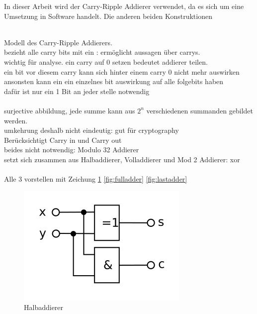 In dieser Arbeit wird der Carry-Ripple Addierer verwendet, da es sich um eine Umsetzung in Software handelt. Die anderen beiden Konstruktionen 

~\\
Modell des Carry-Ripple Addierers.\\
bezieht alle carry bits mit ein : ermöglicht aussagen über carrys.\\
wichtig für analyse. ein carry auf 0 setzen bedeutet addierer teilen.\\
ein bit vor diesem carry kann sich hinter einem carry 0 nicht mehr auswirken\\
ansonsten kann ein ein einzelnes bit auswirkung auf alle folgebits haben\\
dafür ist nur ein 1 Bit an jeder stelle notwendig\\
~\\
surjective abbildung, jede summe kann aus $2^n$ verschiedenen summanden gebildet werden.\\
umkehrung deshalb nicht eindeutig: gut für cryptography
~\\
Berücksichtigt Carry in und Carry out\\
beides nicht notwendig: Modulo 32 Addierer\\
setzt sich zusammen aus Halbaddierer, Volladdierer und Mod 2 Addierer: xor\\
~\\
Alle 3 vorstellen mit Zeichung \ref{fig:halfadder} \ref{fig:fulladder} \ref{fig:lastadder}

\begin{figure}[!h]
  \centering
  \includegraphics[scale=1]{images/halfadder}
  \caption[Halbaddierer]{Halbaddierer\protect\footnotemark}
  \label{fig:halfadder}
\end{figure}

